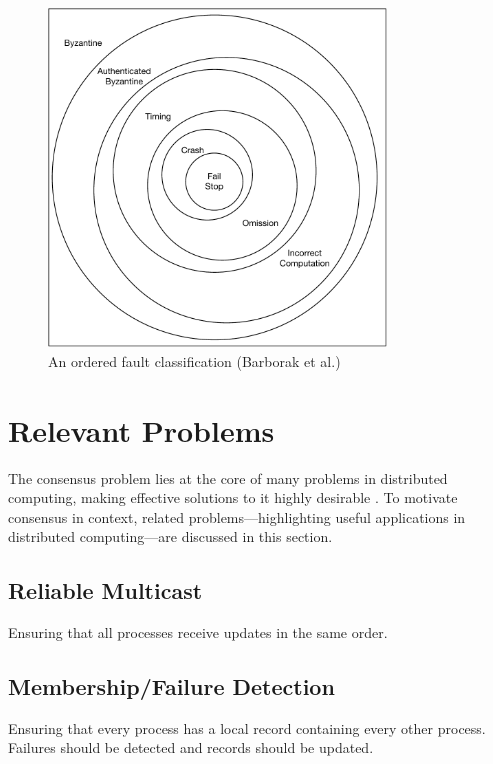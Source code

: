 \documentclass[12pt, a4paper]{article}
\begin{document}
\begin{figure}[htp]
  \centering
  \includegraphics[width=0.8\textwidth]{img/AOFC.pdf}
  \caption{An ordered fault classification (Barborak et al.)}
  \label{fig:aofc}
\end{figure}


\section{Relevant Problems} \label{sec:relevant-problems}

The consensus problem lies at the core of many problems in distributed
computing, making effective solutions to it highly desirable
\cite{fischer1985impossibility}. To motivate consensus in context, related
problems---highlighting useful applications in distributed computing---are
discussed in this section.

\subsection{Reliable Multicast}

Ensuring that all processes receive updates in the same order.

\subsection{Membership/Failure Detection}

Ensuring that every process has a local record containing every other process.
Failures should be detected and records should be updated.
\end{document}
